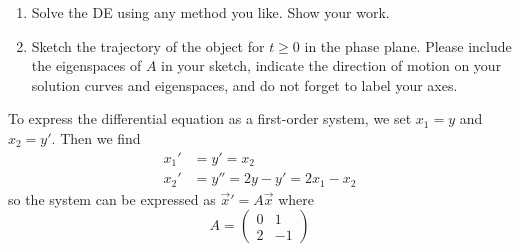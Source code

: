\documentclass[11pt, titlepage]{article}
\begin{document}
\begin{enumerate}
\begin{enumerate}[label={(\alph*)}]
            \item Solve the DE using any method you like. Show your work.

            \item Sketch the trajectory of the object for $t \geq 0$ in the phase plane.
            Please include the eigenspaces of $A$ in your sketch,
            indicate the direction of motion on your solution curves and eigenspaces,
            and do not forget to label your axes.
        \end{enumerate}

        \begin{solution}
            To express the differential equation as a first-order system, we set $x_1 = y$ and $x_2 = y'$.
            Then we find
            \begin{align*}
                x_1' &= y' = x_2 \\
                x_2' &= y'' = 2y - y' = 2x_1 - x_2
            \end{align*}
            so the system can be expressed as $\vec{x}' = A\vec{x}$ where
            \[
            A =
            \begin{pmatrix}
                0 & 1 \\
                2 & -1
            \end{pmatrix}
            \]


\end{solution}
\end{enumerate}
\end{document}
